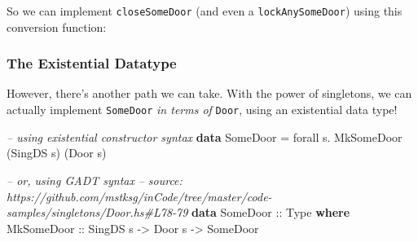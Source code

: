 \documentclass[]{article}
\newenvironment{Shaded}{}{}
\newcommand{\KeywordTok}[1]{\textcolor[rgb]{0.00,0.44,0.13}{\textbf{#1}}}
\newcommand{\DataTypeTok}[1]{\textcolor[rgb]{0.56,0.13,0.00}{#1}}
\newcommand{\CharTok}[1]{\textcolor[rgb]{0.25,0.44,0.63}{#1}}
\newcommand{\CommentTok}[1]{\textcolor[rgb]{0.38,0.63,0.69}{\textit{#1}}}
\newcommand{\OtherTok}[1]{\textcolor[rgb]{0.00,0.44,0.13}{#1}}
\newcommand{\FunctionTok}[1]{\textcolor[rgb]{0.02,0.16,0.49}{#1}}
\newcommand{\NormalTok}[1]{#1}
\begin{document}
So we can implement \texttt{closeSomeDoor} (and even a \texttt{lockAnySomeDoor})
using this conversion function:

\begin{Shaded}
\end{Shaded}

\subsubsection{The Existential Datatype}\label{the-existential-datatype}

However, there's another path we can take. With the power of singletons, we can
actually implement \texttt{SomeDoor} \emph{in terms of} \texttt{Door}, using an
existential data type!

\begin{Shaded}
\begin{Highlighting}[]
\CommentTok{-- using existential constructor syntax}
\KeywordTok{data} \DataTypeTok{SomeDoor} \FunctionTok{=}\NormalTok{ forall s}\FunctionTok{.} \DataTypeTok{MkSomeDoor}\NormalTok{ (}\DataTypeTok{SingDS}\NormalTok{ s) (}\DataTypeTok{Door}\NormalTok{ s)}

\CommentTok{-- or, using GADT syntax}
\CommentTok{-- source: https://github.com/mstksg/inCode/tree/master/code-samples/singletons/Door.hs#L78-79}
\KeywordTok{data} \DataTypeTok{SomeDoor}\OtherTok{ ::} \DataTypeTok{Type} \KeywordTok{where}
    \DataTypeTok{MkSomeDoor}\OtherTok{ ::} \DataTypeTok{SingDS}\NormalTok{ s }\OtherTok{->} \DataTypeTok{Door}\NormalTok{ s }\OtherTok{->} \DataTypeTok{SomeDoor}
\end{Highlighting}
\end{Shaded}
\end{document}
